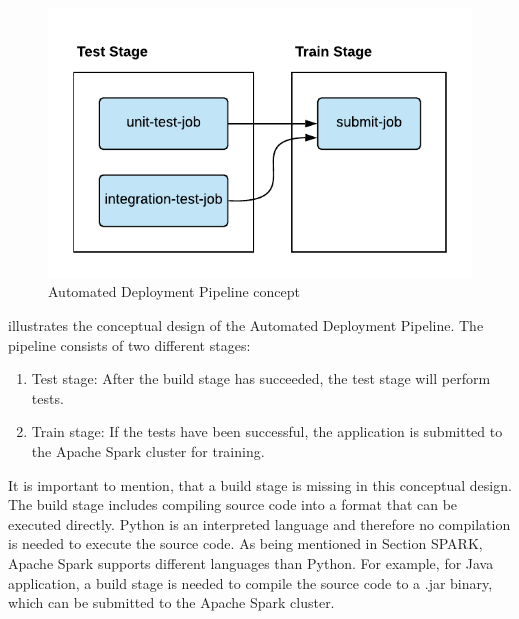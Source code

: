 \begin{figure}[h]
\centering
\includegraphics[scale=1]{images/05_conceptual_design/automated_deployment_pipeline/ci_cd_concept}
\caption{Automated Deployment Pipeline concept}
\label{fig:05_deployment_concept}
\end{figure}
 illustrates the conceptual design of the Automated Deployment Pipeline.
The pipeline consists of two different stages:
\begin{enumerate}
\item Test stage: After the build stage has succeeded, the test stage will perform tests.
\item Train stage: If the tests have been successful, the application is submitted to the Apache Spark cluster for training.
\end{enumerate}
It is important to mention, that a build stage is missing in this conceptual design. The build stage includes compiling source code into a format that can be executed directly.
Python is an interpreted language and therefore no compilation is needed to execute the source code. 
As being mentioned in Section SPARK, Apache Spark supports different languages than Python.  For example, for Java application, a build stage is needed to compile the source code to a .jar binary, which can be submitted to the Apache Spark cluster.


